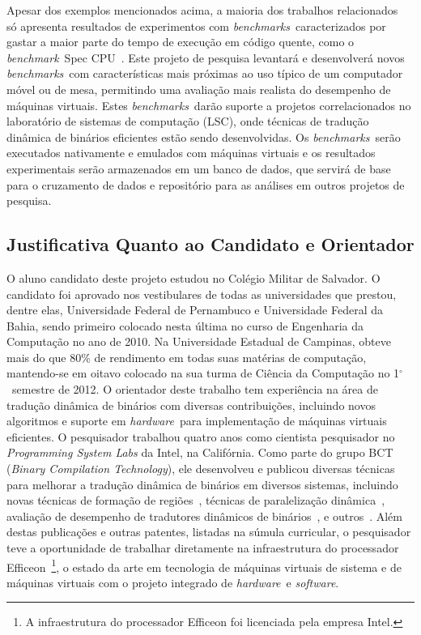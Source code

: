 \documentclass[a4paper,12pt]{article}
\def\degr{${}^\circ$}
\newcommand{\software}{\emph{software}}
\newcommand{\hardware}{\emph{hardware}}
\newcommand{\benchmark}{\emph{benchmark}}
\newcommand{\benchmarks}{\emph{benchmarks}}
\begin{document}
Apesar dos exemplos mencionados acima, a maioria dos trabalhos
relacionados~\cite{Hen00, pin} só apresenta resultados de experimentos com
\benchmarks\ caracterizados por gastar a maior parte do tempo de execução em
código quente, como o \benchmark\ Spec CPU~\cite{Hen00}. Este projeto de
pesquisa levantará e desenvolverá novos \benchmarks\ com características mais
próximas ao uso típico de um computador móvel ou de mesa, permitindo uma
avaliação mais realista do desempenho de máquinas virtuais. Estes
\benchmarks\ darão suporte a projetos correlacionados no laboratório de sistemas
de computação (LSC), onde técnicas de tradução dinâmica de binários eficientes
estão sendo desenvolvidas. Os \benchmarks\ serão executados nativamente e
emulados com máquinas virtuais e os resultados experimentais serão armazenados
em um banco de dados, que servirá de base para o cruzamento de dados e
repositório para as análises em outros projetos de pesquisa.
%
%
\subsection{Justificativa Quanto ao Candidato e Orientador}
\label{subsec:just}
%
O aluno candidato deste projeto estudou no Colégio Militar de Salvador. O
candidato foi aprovado nos vestibulares de todas as universidades que prestou,
dentre elas, Universidade Federal de Pernambuco e Universidade Federal da Bahia,
sendo primeiro colocado nesta última no curso de Engenharia da Computação no ano
de 2010. Na Universidade Estadual de Campinas, obteve mais do que 80\% de
rendimento em todas suas matérias de computação, mantendo-se em oitavo colocado
na sua turma de Ciência da Computação no 1\degr\ semestre de 2012. %
%
O orientador deste trabalho tem experiência na área de tradução dinâmica de
binários com diversas contribuições, incluindo novos algoritmos e suporte em
\hardware\ para implementação de máquinas virtuais eficientes. O pesquisador
trabalhou quatro anos como cientista pesquisador no \emph{Programming System
  Labs} da Intel, na Califórnia. Como parte do grupo BCT (\emph{Binary
  Compilation Technology}), ele desenvolveu e publicou diversas técnicas para
melhorar a tradução dinâmica de binários em diversos sistemas, incluindo novas
técnicas de formação de regiões~\cite{BWBW11,PGW+08,BWW+10}, técnicas de
paralelização dinâmica~\cite{WWB+09}, avaliação de desempenho de tradutores
dinâmicos de binários~\cite{BW08, BW09}, e outros~\cite{WHBW11, BWWA05, BWWA06,
  PABW10}. Além destas publicações e outras patentes, listadas na súmula
curricular, o pesquisador teve a oportunidade de trabalhar diretamente na
infraestrutura do processador Efficeon~\cite{Kre03}\footnote{A infraestrutura do
  processador Efficeon foi licenciada pela empresa Intel.}, o estado da arte em
tecnologia de máquinas virtuais de sistema e de máquinas virtuais com o projeto
integrado de \hardware\ e \software.
\end{document}

